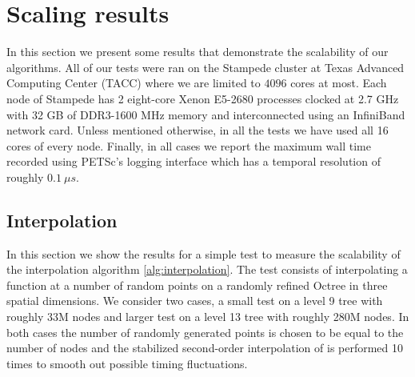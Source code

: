 \section{Scaling results} \label{sec:scaling}
In this section we present some results that demonstrate the scalability of our algorithms. All of our tests were ran on the Stampede cluster at Texas Advanced Computing Center (TACC) where we are limited to $4096$ cores at most. Each node of Stampede has 2 eight-core Xenon E5-2680 processes clocked at 2.7 GHz with 32 GB of DDR3-1600 MHz memory and interconnected using an InfiniBand network card. Unless mentioned otherwise, in all the tests we have used all 16 cores of every node. Finally, in all cases we report the maximum wall time recorded using PETSc's logging interface which has a temporal resolution of roughly $0.1 \: \mu s$.

\subsection{Interpolation}
In this section we show the results for a simple test to measure the scalability of the interpolation algorithm \ref{alg:interpolation}. The test consists of interpolating a function at a number of random points on a randomly refined Octree in three spatial dimensions. We consider two cases, a small test on a level 9 tree with roughly 33M nodes and larger test on a level 13 tree with roughly 280M nodes. In both cases the number of randomly generated points is chosen to be equal to the number of nodes and the stabilized second-order interpolation of \cite{Min;Gibou:07:A-second-order-accur} is performed 10 times to smooth out possible timing fluctuations.

